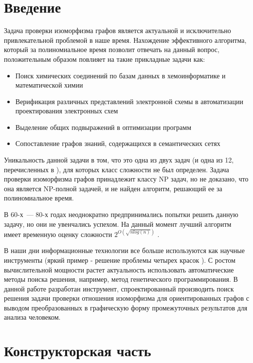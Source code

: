 \documentclass[russian,utf8,emptystyle]{eskdtext}
\begin{document}


\newpage
\tableofcontents
\newpage

\begin{spacing}{1.5}
\section{Введение}
Задача проверки изоморфизма графов является актуальной и исключительно привлекательной проблемой в наше время. Нахождение эффективного алгоритма, который за полиномиальное время позволит отвечать на данный вопрос, положительным образом повлияет на такие прикладные задачи как:
\begin{itemize}
\item Поиск химических соединений по базам данных в хемоинформатике и математической химии
\item Верификация различных представлений электронной схемы в автоматизации проектирования электронных схем
\item Выделение общих подвыражений в оптимизации программ
\item Сопоставление графов знаний, содержащихся в семантических сетях
\end{itemize}
Уникальность данной задачи в том, что это одна из двух задач (и одна из 12, перечисленных в \cite{GareyAndJohnson1979}), для которых класс сложности не был определен. Задача проверки изоморфизма графов принадлежит классу NP задач, но не доказано, что она является NP-полной задачей, и не найден алгоритм, решающий ее за полиномиальное время.

В 60-х~--- 80-х годах неоднократно предпринимались попытки решить данную задачу, но они не увенчались успехом. На данный момент лучший алгоритм имеет временную оценку сложности $2^{O(\sqrt{n log(n)})}$ \cite{Johnson2005} \cite{BabaiCodenotti2008}.

В наши дни информационные технологии все больше используются как научные инструменты (яркий пример - решение проблемы четырех красок \cite{FourColourProblem}). С ростом вычислительной мощности растет актуальность использовать автоматические методы поиска решения, например, метод генетического программирования. В данной работе разработан инструмент, спроектированный производить поиск решения задачи проверки отношения изоморфизма для ориентированных графов с выводом преобразованных в графическую форму промежуточных результатов для анализа человеком.

\newpage
\section{Конструкторская часть}

\end{spacing}
\end{document}
